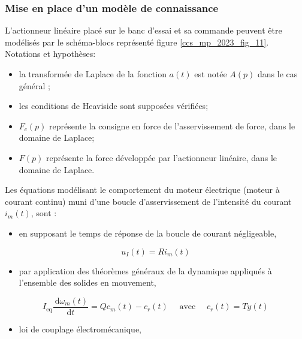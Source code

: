 \subsubsection{Mise en place d'un modèle de connaissance}%

L'actionneur linéaire placé sur le banc d'essai et sa commande peuvent être modélisés par le schéma-blocs représenté figure \ref{ccs_mp_2023_fig_11}.\\
Notations et hypothèses:

\begin{itemize}
  \item la transformée de Laplace de la fonction $a(t)$ est notée $A(p)$ dans le cas général ;
  \item les conditions de Heaviside sont supposées vérifiées;
  \item $F_{c}(p)$ représente la consigne en force de l'asservissement de force, dans le domaine de Laplace;
  \item $F(p)$ représente la force développée par l'actionneur linéaire, dans le domaine de Laplace.
\end{itemize}

Les équations modélisant le comportement du moteur électrique (moteur à courant continu) muni d'une boucle d'asservissement de l'intensité du courant $i_{m}(t)$, sont :

\begin{itemize}
  \item en supposant le temps de réponse de la boucle de courant négligeable,
\end{itemize}

$$
u_{I}(t)=R i_{m}(t)
$$

\begin{itemize}
  \item par application des théorèmes généraux de la dynamique appliqués à l'ensemble des solides en mouvement,
\end{itemize}

$$
I_{\mathrm{eq}} \frac{\mathrm{~d} \omega_{m}(t)}{\mathrm{d} t}=Q c_{m}(t)-c_{r}(t) \quad \text { avec } \quad c_{r}(t)=T y(t)
$$

\begin{itemize}
  \item loi de couplage électromécanique,
\end{itemize}

